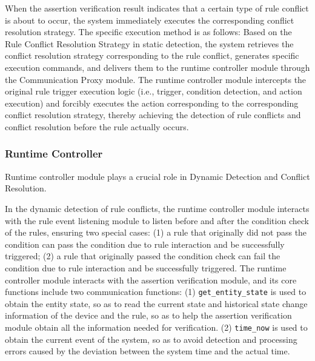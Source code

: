 When the assertion verification result indicates that a certain type of rule conflict is about to occur, the system immediately executes the corresponding conflict resolution strategy. The specific execution method is as follows: Based on the Rule Conflict Resolution Strategy in static detection, the system retrieves the conflict resolution strategy corresponding to the rule conflict, generates specific execution commands, and delivers them to the runtime controller module through the Communication Proxy module. The runtime controller module intercepts the original rule trigger execution logic (i.e., trigger, condition detection, and action execution) and forcibly executes the action corresponding to the corresponding conflict resolution strategy, thereby achieving the detection of rule conflicts and conflict resolution before the rule actually occurs.
\subsubsection{Runtime Controller}
Runtime controller module plays a crucial role in Dynamic Detection and Conflict Resolution.

In the dynamic detection of rule conflicts, the runtime controller module interacts with the rule event listening module to listen before and after the condition check of the rules, ensuring two special cases: (1) a rule that originally did not pass the condition can pass the condition due to rule interaction and be successfully triggered; (2) a rule that originally passed the condition check can fail the condition due to rule interaction and be successfully triggered. The runtime controller module interacts with the assertion verification module, and its core functions include two communication functions: (1) \texttt{get\_entity\_state} is used to obtain the entity state, so as to read the current state and historical state change information of the device and the rule, so as to help the assertion verification module obtain all the information needed for verification. (2) \texttt{time\_now} is used to obtain the current event of the system, so as to avoid detection and processing errors caused by the deviation between the system time and the actual time.

